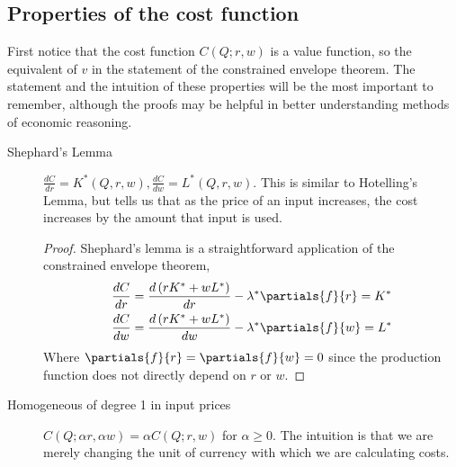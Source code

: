 \subsection*{Properties of the cost function} \label{sec:cost_properties}
First notice that the cost function $C(Q; r, w)$ is a value function, so the equivalent of $v$ in the statement of the constrained envelope theorem. The statement and the intuition of these properties will be the most important to remember, although the proofs may be helpful in better understanding methods of economic reasoning.
\begin{description}
    \item[Shephard's Lemma] $\frac{dC}{dr} = K^*(Q, r, w), \frac{dC}{dw} = L^*(Q, r, w)$. This is similar to Hotelling's Lemma, but tells us that as the price of an input increases, the cost increases by the amount that input is used.
    
    \begin{proof}
        Shephard's lemma is a straightforward application of the constrained envelope theorem,
        \begin{align*}
            \frac{dC}{dr} &= \frac{d\left(rK^* + wL^*\right)}{dr} - \lambda^* \partials{f}{r} = K^* \\
            \frac{dC}{dw} &= \frac{d\left(rK^* + wL^*\right)}{dw} - \lambda^* \partials{f}{w} = L^*
        \end{align*}
        Where $\partials{f}{r} = \partials{f}{w} = 0$ since the production function does not directly depend on $r$ or $w$.
    \end{proof} 
    \item[Homogeneous of degree 1 in input prices] $C(Q; \alpha r, \alpha w) = \alpha C(Q; r, w)$ for $\alpha \geq 0$. The intuition is that we are merely changing the unit of currency with which we are calculating costs. 
    

\end{description}
